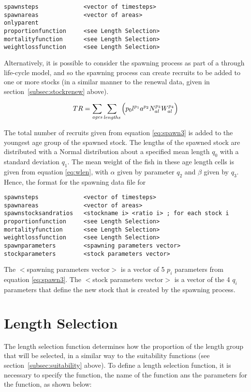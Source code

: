 \documentclass [a4paper, 10pt]{book}
\begin{document}
{\small\begin{verbatim}
spawnsteps             <vector of timesteps>
spawnareas             <vector of areas>
onlyparent
proportionfunction     <see Length Selection>
mortalityfunction      <see Length Selection>
weightlossfunction     <see Length Selection>
\end{verbatim}}

Alternatively, it is possible to consider the spawning process as part of a through life-cycle model, and so the spawning process can create recruits to be added to one or more stocks (in a similar manner to the renewal data, given in section~\ref{subsec:stockrenew} above).

\begin{equation}\label{eq:spawn3}
TR = \sum_{\it ages}\sum_{\it lengths}\Big( p_{0} l ^{p_{1}} a ^{p_{2}} N_{al} ^{p_{3}} W_{al} ^{p_{4}} \Big)
\end{equation}

The total number of recruits given from equation \ref{eq:spawn3} is added to the youngest age group of the spawned stock.  The lengths of the spawned stock are distributed with a Normal distribution about a specified mean length $q_0$ with a standard deviation $q_1$.  The mean weight of the fish in these age length cells is  given from equation \ref{eq:wlen}, with $\alpha$ given by parameter $q_2$ and $\beta$ given by $q_3$.  Hence, the format for the spawning data file for

{\small\begin{verbatim}
spawnsteps             <vector of timesteps>
spawnareas             <vector of areas>
spawnstocksandratios   <stockname i> <ratio i> ; for each stock i
proportionfunction     <see Length Selection>
mortalityfunction      <see Length Selection>
weightlossfunction     <see Length Selection>
spawnparameters        <spawning parameters vector>
stockparameters        <stock parameters vector>
\end{verbatim}}

The $<$spawning parameters vector$>$ is a vector of 5 $p_i$ parameters from equation \ref{eq:spawn3}.  The $<$stock parameters vector$>$ is a vector of the 4 $q_i$ parameters that define the new stock that is created by the spawning process.

\section{Length Selection}\label{subsec:lselection}
The length selection function determines how the proportion of the length group that will be selected, in a similar way to the suitability functions (see section~\ref{subsec:suitability} above).  To define a length selection function, it is necessary to specify the function, the name of the function ans the parameters for the function, as shown below:
\end{document}
